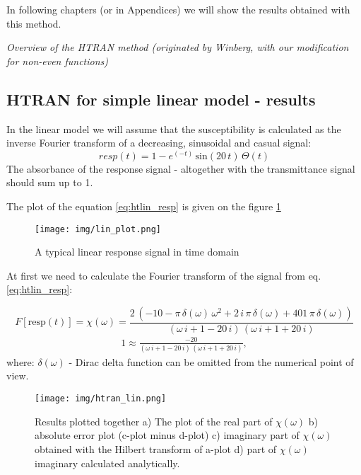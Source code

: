 \documentclass[12pt,twoside,a4paper]{article}
\numberwithin{equation}{subsection}
\numberwithin{figure}{subsection}
\begin{document}
In following chapters (or in Appendices) we will show the results obtained with this method.

\textit{Overview of the HTRAN method (originated by Winberg, with our modification for non-even functions)}

\subsection{HTRAN for simple linear model - results} \label{chap:htran_lin}

In the linear model we will assume that the susceptibility is calculated as the inverse Fourier transform of a decreasing,
sinusoidal and casual signal:
\begin{equation} \label{eq:htlin_resp}
  resp(t) = 1 - e^{( - t)}\,\mathrm{sin}(20\,t)\,\Theta (t) 
\end{equation}
The absorbance of the response signal - altogether with the transmittance signal should sum up to 1.

The plot of the equation \ref{eq:htlin_resp} is given on the figure \ref{fig:lin_plot}
\begin{figure}[H]
  \texttt{[image: img/lin\_plot.png]}
  \caption{A typical linear response signal in time domain \label{fig:lin_plot}}
\end{figure}

At first we need to calculate the Fourier transform of the signal from eq. \ref{eq:htlin_resp}:

\begin{equation} \label{eq:htlin_fresp}
  F[\mathrm{resp}(t)] = \chi (\omega )=\frac {2\,( - 10 - \pi \,\delta (\omega )\,\omega^{2} + 2\,i\,\pi \,\delta (\omega ) +
  401\,\pi \,\delta (\omega))}{(\omega \,i + 1 - 20\,i)\,(\omega \,i + 1 + 20\,i)} 
\end{equation}
\begin{alignat*}{1}
  \approx \frac{ -20}{(\omega \,i + 1 -20\,i)\,(\omega \,i + 1 + 20\,i)},
\end{alignat*}
where: $\delta (\omega )$ - Dirac delta function can be omitted from the numerical point of view.

\begin{figure} 
  \texttt{[image: img/htran\_lin.png]}
  \caption{Results plotted together 
   a) The plot of the real part of $\chi (\omega )$ 
   b) absolute error plot (c-plot minus d-plot) 
   c) imaginary part of $\chi (\omega )$ obtained with the Hilbert transform of a-plot 
   d) part of $\chi (\omega )$ imaginary calculated analytically. \label{eq:htran_lin}
  }
\end{figure}
\end{document}

